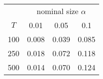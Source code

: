 % 
\begin{tabular}{cccc}
  \hline
  & \multicolumn{3}{c}{nominal size $\alpha$} \\
 $T$ & 0.01 & 0.05 & 0.1 \\
 \hline
100 & 0.008 & 0.039 & 0.085 \\ 
  250 & 0.018 & 0.072 & 0.118 \\ 
  500 & 0.014 & 0.070 & 0.124 \\ 
   \hline
\end{tabular}
